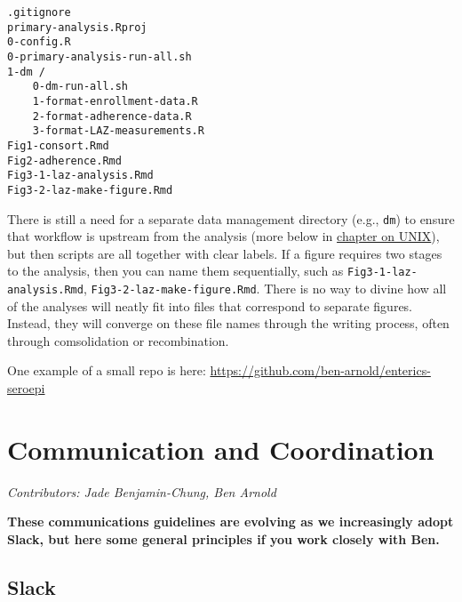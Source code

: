 \documentclass[]{book}
\begin{document}
\begin{verbatim}
.gitignore
primary-analysis.Rproj
0-config.R
0-primary-analysis-run-all.sh
1-dm /
    0-dm-run-all.sh
    1-format-enrollment-data.R
    2-format-adherence-data.R
    3-format-LAZ-measurements.R
Fig1-consort.Rmd
Fig2-adherence.Rmd
Fig3-1-laz-analysis.Rmd
Fig3-2-laz-make-figure.Rmd
\end{verbatim}

There is still a need for a separate data management directory (e.g., \texttt{dm}) to ensure that workflow is upstream from the analysis (more below in \protect\hyperlink{unix}{chapter on UNIX}), but then scripts are all together with clear labels. If a figure requires two stages to the analysis, then you can name them sequentially, such as \texttt{Fig3-1-laz-analysis.Rmd}, \texttt{Fig3-2-laz-make-figure.Rmd}. There is no way to divine how all of the analyses will neatly fit into files that correspond to separate figures. Instead, they will converge on these file names through the writing process, often through comsolidation or recombination.

One example of a small repo is here:
\url{https://github.com/ben-arnold/enterics-seroepi}

\hypertarget{commcoord}{%
\chapter{Communication and Coordination}\label{commcoord}}

\emph{Contributors: Jade Benjamin-Chung, Ben Arnold}

\textbf{These communications guidelines are evolving as we increasingly adopt Slack, but here some general principles if you work closely with Ben.}

\hypertarget{slack}{%
\section{Slack}\label{slack}}
\end{document}
